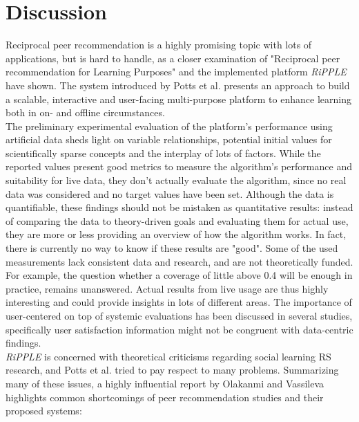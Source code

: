 \documentclass[conference]{IEEEtran}
\begin{document}
\section{Discussion} \label{extensions}
Reciprocal peer recommendation is a highly promising topic with lots of applications, but is hard to handle, as a closer examination of "Reciprocal peer recommendation for Learning Purposes" and the implemented platform \textit{RiPPLE} have shown. The system introduced by Potts et al. presents an approach to build a scalable, interactive and user-facing multi-purpose platform to enhance learning both in on- and offline circumstances.\\
The preliminary experimental evaluation of the platform's performance using artificial data sheds light on variable relationships, potential initial values for scientifically sparse concepts and the interplay of lots of factors. While the reported values present good metrics to measure the algorithm's performance and suitability for live data, they don't actually evaluate the algorithm, since no real data was considered and no target values have been set. Although the data is quantifiable, these findings should not be mistaken as quantitative results: instead of comparing the data to theory-driven goals and evaluating them for actual use, they are more or less providing an overview of how the algorithm works. In fact, there is currently no way to know if these results are "good". Some of the used measurements lack consistent data and research, and are not theoretically funded. For example, the question whether a coverage of little above 0.4 will be enough in practice, remains unanswered. Actual results from live usage are thus highly interesting and could provide insights in lots of different areas. The importance of user-centered on top of systemic evaluations has been discussed in several studies, specifically user satisfaction information might not be congruent with data-centric findings. \cite{7994718, olakanmi2017group}\\
\textit{RiPPLE} is concerned with theoretical criticisms regarding social learning RS research, and Potts et al. tried to pay respect to many problems. Summarizing many of these issues, a highly influential report by Olakanmi and Vassileva \cite{olakanmi2017group} highlights common shortcomings of peer recommendation studies and their proposed systems:
\end{document}
